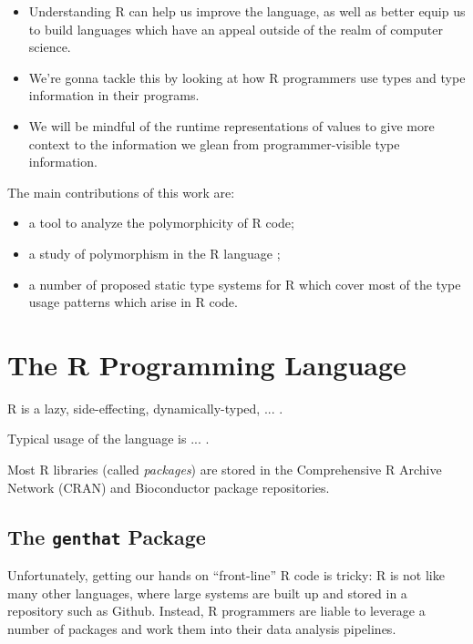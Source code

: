 \documentclass[acmsmall,10pt,review,anonymous]{acmart}\settopmatter{printfolios=true,printccs=false,printacmref=false}
\begin{document}
\begin{itemize}
    \item Understanding R can help us improve the language, as well as
      better equip us to build languages which have an appeal outside of the
      realm of computer science.
    \item We're gonna tackle this by looking at how R programmers use types
      and type information in their programs.
    \item We will be mindful of the runtime representations of values to
      give more context to the information we glean from programmer-visible
      type information.
\end{itemize}

The main contributions of this work are:

\begin{itemize}
\item {} a tool to analyze the polymorphicity of R code;
\item a study of polymorphism in the R language ;
\item a number of proposed static type systems for R which cover most of the
  type usage patterns which arise in R code.
\end{itemize}

%
\section{The R Programming Language}
\label{sec:rlang}

R is a lazy, side-effecting, dynamically-typed, ... .

Typical usage of the language is ... .   

Most R libraries (called \textit{packages}) are stored in the Comprehensive
R Archive Network (CRAN) and Bioconductor package repositories.  



\subsection{The \texttt{genthat} Package}

Unfortunately, getting our hands on ``front-line'' R code is tricky: R is
not like many other languages, where large systems are built up and stored
in a repository such as Github.  Instead, R programmers are liable to
leverage a number of packages and work them into their data analysis
pipelines.
\end{document}
